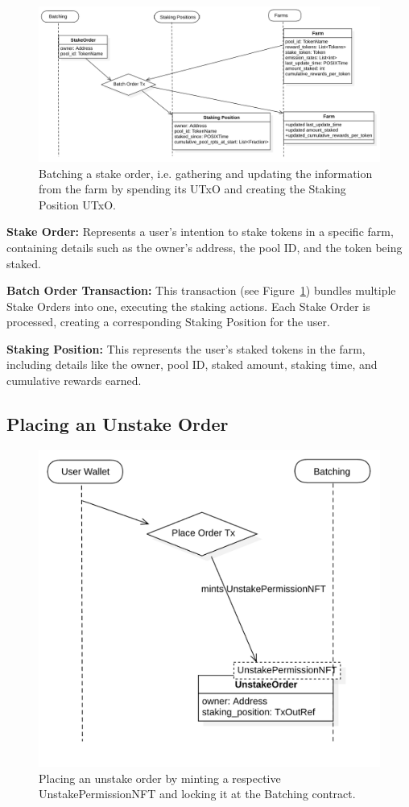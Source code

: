 \documentclass[12pt,parskip=full, tikz]{article}
\begin{document}
\begin{figure}
    \centering
    \includegraphics[width=\textwidth]{figures/batch-stake-order.png}
    \caption{Batching a stake order, i.e. gathering and updating the information from the farm by spending its UTxO and creating the Staking Position UTxO.}
    \label{fig:batch-stake-order}
\end{figure}

\textbf{Stake Order:} Represents a user's intention to stake tokens in a specific farm, containing details such as the owner's address, the pool ID, and the token being staked.

\textbf{Batch Order Transaction:} This transaction (see Figure~\ref{fig:batch-stake-order}) bundles multiple Stake Orders into one, executing the staking actions. Each Stake Order is processed, creating a corresponding Staking Position for the user.

\textbf{Staking Position:} This represents the user's staked tokens in the farm, including details like the owner, pool ID, staked amount, staking time, and cumulative rewards earned.

\subsection{Placing an Unstake Order}

\begin{figure}
    \centering
    \includegraphics[width=.5\textwidth]{figures/place-unstake-order.png}
    \caption{Placing an unstake order by minting a respective UnstakePermissionNFT and locking it at the Batching contract.}
    \label{fig:place-unstake-order}
\end{figure}
\end{document}
